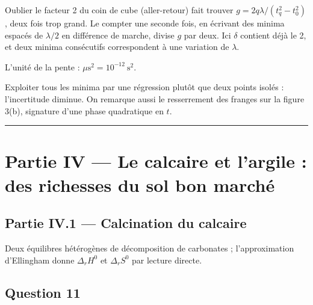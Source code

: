 \documentclass[11pt,a4paper]{article}
\begin{document}
\begin{piege}

Oublier le facteur 2 du coin de cube (aller-retour) fait trouver \(g=2q\lambda/(t_q^2-t_0^2)\), deux fois trop grand. Le compter une seconde fois, en écrivant des minima espacés de \(\lambda/2\) en différence de marche, divise \(g\) par deux. Ici \(\delta\) contient déjà le 2, et deux minima consécutifs correspondent à une variation de \(\lambda\).

\end{piege}

\begin{piege}

L'unité de la pente : \(\mu\mathrm s^2=10^{-12}\ \mathrm s^2\).

\end{piege}

\begin{methode}

Exploiter tous les minima par une régression plutôt que deux points isolés : l'incertitude diminue. On remarque aussi le resserrement des franges sur la figure 3(b), signature d'une phase quadratique en \(t\).

\end{methode}

\begin{center}\rule{0.5\linewidth}{0.5pt}\end{center}

\hypertarget{partie-iv-le-calcaire-et-largile-des-richesses-du-sol-bon-marchuxe9}{%
\section{Partie IV --- Le calcaire et l'argile : des richesses du sol bon marché}\label{partie-iv-le-calcaire-et-largile-des-richesses-du-sol-bon-marchuxe9}}

\hypertarget{partie-iv.1-calcination-du-calcaire}{%
\subsection{Partie IV.1 --- Calcination du calcaire}\label{partie-iv.1-calcination-du-calcaire}}

Deux équilibres hétérogènes de décomposition de carbonates ; l'approximation d'Ellingham donne \(\Delta_rH^0\) et \(\Delta_rS^0\) par lecture directe.

\hypertarget{question-11}{%
\subsection{Question 11}\label{question-11}}
\end{document}
